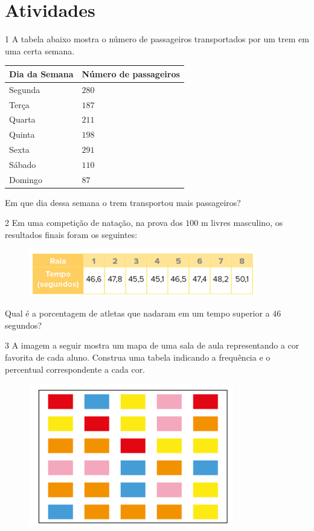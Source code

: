 \section{Atividades}

\num{1}  A tabela abaixo mostra o número de passageiros transportados por um
trem em uma certa semana.

\begin{longtable}[]{@{}ll@{}}
\toprule
Dia da Semana & Número de passageiros\tabularnewline
\midrule
\endhead
Segunda & $280$\tabularnewline
Terça & $187$\tabularnewline
Quarta & $211$\tabularnewline
Quinta & $198$\tabularnewline
Sexta & $291$\tabularnewline
Sábado & $110$\tabularnewline
Domingo & $87$\tabularnewline
\bottomrule
\end{longtable}

Em que dia dessa semana o trem transportou mais passageiros?


\num{2}  Em uma competição de natação, na prova dos $100$ m livres masculino, os
resultados finais foram os seguintes:

\begin{figure}
\includegraphics[width=3.92708in,height=0.8125in]{./imgSAEB_6_MAT/media/image81.png}
\end{figure}

Qual é a porcentagem de atletas que nadaram em um tempo superior a $46$
segundos?


\num{3}  A imagem a seguir mostra um mapa de uma sala de aula representando a
cor favorita de cada aluno. Construa uma tabela indicando a frequência e
o percentual correspondente a cada cor.

\begin{figure}
\includegraphics[width=3.52292in,height=2.45347in]{./imgSAEB_6_MAT/media/image82.png}
\end{figure}

